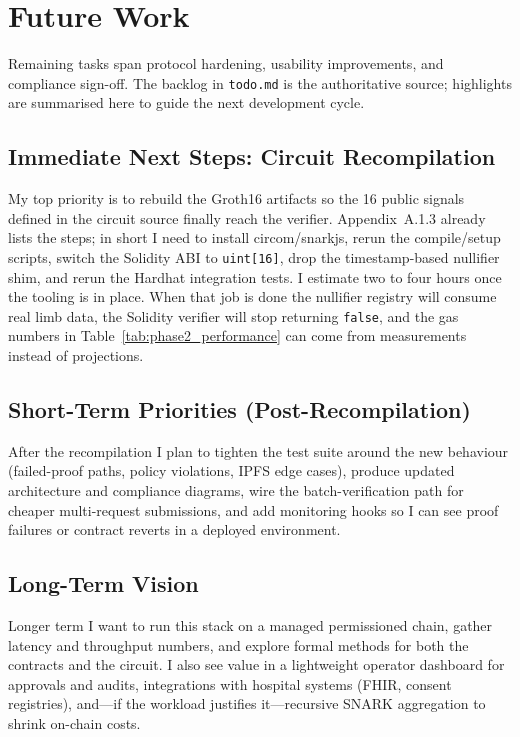 \section{Future Work}

Remaining tasks span protocol hardening, usability improvements, and compliance sign-off. The backlog in \texttt{todo.md} is the authoritative source; highlights are summarised here to guide the next development cycle.

\subsection{Immediate Next Steps: Circuit Recompilation}

My top priority is to rebuild the Groth16 artifacts so the 16 public signals defined in the circuit source finally reach the verifier. Appendix~A.1.3 already lists the steps; in short I need to install circom/snarkjs, rerun the compile/setup scripts, switch the Solidity ABI to \texttt{uint[16]}, drop the timestamp-based nullifier shim, and rerun the Hardhat integration tests. I estimate two to four hours once the tooling is in place. When that job is done the nullifier registry will consume real limb data, the Solidity verifier will stop returning \texttt{false}, and the gas numbers in Table~\ref{tab:phase2_performance} can come from measurements instead of projections.

\subsection{Short-Term Priorities (Post-Recompilation)}

After the recompilation I plan to tighten the test suite around the new behaviour (failed-proof paths, policy violations, IPFS edge cases), produce updated architecture and compliance diagrams, wire the batch-verification path for cheaper multi-request submissions, and add monitoring hooks so I can see proof failures or contract reverts in a deployed environment.

\subsection{Long-Term Vision}

Longer term I want to run this stack on a managed permissioned chain, gather latency and throughput numbers, and explore formal methods for both the contracts and the circuit. I also see value in a lightweight operator dashboard for approvals and audits, integrations with hospital systems (FHIR, consent registries), and—if the workload justifies it—recursive SNARK aggregation to shrink on-chain costs.

